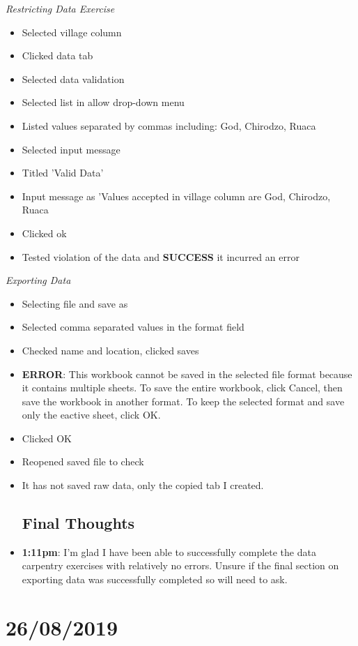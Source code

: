 \documentclass{article}
\begin{document}
\textit{Restricting Data Exercise}
\begin{itemize}
\item Selected village column
\item Clicked data tab
\item Selected data validation
\item Selected list in allow drop-down menu
\item Listed values separated by commas including: God, Chirodzo, Ruaca
\item Selected input message
\item Titled 'Valid Data'
\item Input message as 'Values accepted in village column are God, Chirodzo, Ruaca
\item Clicked ok
\item Tested violation of the data and \textbf{SUCCESS} it incurred an error
\end{itemize}

\textit{Exporting Data}
\begin{itemize}
\item Selecting file and save as
\item Selected comma separated values in the format field
\item Checked name and location, clicked saves
\item \textbf{ERROR}: This workbook cannot be saved in the selected file format because it contains multiple sheets. To save the entire workbook, click Cancel, then save the workbook in another format. To keep the selected format and save only the eactive sheet, click OK.
\item Clicked OK
\item Reopened saved file to check
\item It has not saved raw data, only the copied tab I created.

\subsection{Final Thoughts}
\item \textbf{1:11pm}: I'm glad I have been able to successfully complete the data carpentry exercises with relatively no errors. Unsure if the final section on exporting data was successfully completed so will need to ask. 


\end{itemize}

\section{26/08/2019}
\end{document}
